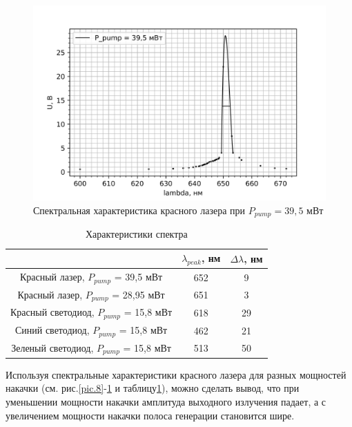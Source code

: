 \documentclass[a4paper,12pt]{report}
\begin{document}
\begin{figure}[H]
	\centering
	\includegraphics[scale=0.7]{Red_lazer_2_P_pump = 39,5.png}
	\caption{Спектральная характеристика красного лазера при $P_{pump} = 39,5$ мВт}
        \label{pic.9}
\end{figure}

\begin{table}[H]
\begin{tabular}{|c|c|c|}
\hline
                                     & $\lambda_{peak}$, нм & $\Delta\lambda$, нм \\ \hline
Красный лазер, $P_{pump}$ = 39,5 мВт     & 652        & 9             \\ \hline
Красный лазер, $P_{pump}$ = 28,95 мВт    & 651        & 3             \\ \hline
Красный светодиод, $P_{pump}$ = 15,8 мВт & 618        & 29            \\ \hline
Синий светодиод, $P_{pump}$ = 15,8 мВт   & 462        & 21            \\ \hline
Зеленый светодиод, $P_{pump}$ = 15,8 мВт & 513        & 50            \\ \hline
\end{tabular}
\caption{Характеристики спектра}
\label{tab.1}
\end{table}

Используя спектральные характеристики красного лазера для разных мощностей накачки (см. рис.\ref{pic.8}-\ref{pic.9} и таблицу\ref{tab.1}), можно сделать вывод, что при уменьшении мощности накачки амплитуда выходного излучения падает, а с увеличением мощности накачки полоса генерации становится шире.
\end{document}
